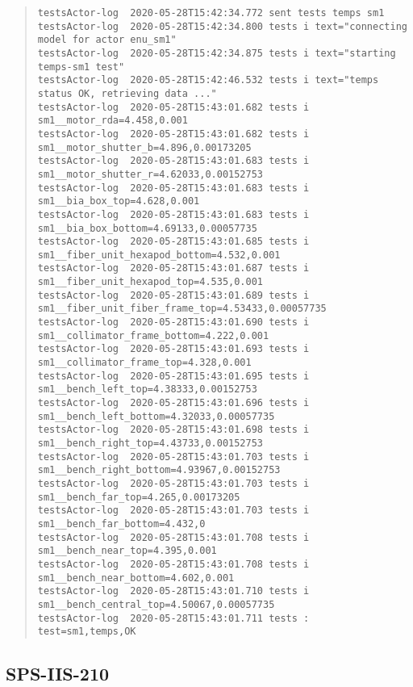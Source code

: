 \begin{quote}
\begin{tiny}
\begin{verbatim}
testsActor-log  2020-05-28T15:42:34.772 sent tests temps sm1
testsActor-log  2020-05-28T15:42:34.800 tests i text="connecting model for actor enu_sm1"
testsActor-log  2020-05-28T15:42:34.875 tests i text="starting temps-sm1 test"
testsActor-log  2020-05-28T15:42:46.532 tests i text="temps status OK, retrieving data ..."
testsActor-log  2020-05-28T15:43:01.682 tests i sm1__motor_rda=4.458,0.001
testsActor-log  2020-05-28T15:43:01.682 tests i sm1__motor_shutter_b=4.896,0.00173205
testsActor-log  2020-05-28T15:43:01.683 tests i sm1__motor_shutter_r=4.62033,0.00152753
testsActor-log  2020-05-28T15:43:01.683 tests i sm1__bia_box_top=4.628,0.001
testsActor-log  2020-05-28T15:43:01.683 tests i sm1__bia_box_bottom=4.69133,0.00057735
testsActor-log  2020-05-28T15:43:01.685 tests i sm1__fiber_unit_hexapod_bottom=4.532,0.001
testsActor-log  2020-05-28T15:43:01.687 tests i sm1__fiber_unit_hexapod_top=4.535,0.001
testsActor-log  2020-05-28T15:43:01.689 tests i sm1__fiber_unit_fiber_frame_top=4.53433,0.00057735
testsActor-log  2020-05-28T15:43:01.690 tests i sm1__collimator_frame_bottom=4.222,0.001
testsActor-log  2020-05-28T15:43:01.693 tests i sm1__collimator_frame_top=4.328,0.001
testsActor-log  2020-05-28T15:43:01.695 tests i sm1__bench_left_top=4.38333,0.00152753
testsActor-log  2020-05-28T15:43:01.696 tests i sm1__bench_left_bottom=4.32033,0.00057735
testsActor-log  2020-05-28T15:43:01.698 tests i sm1__bench_right_top=4.43733,0.00152753
testsActor-log  2020-05-28T15:43:01.703 tests i sm1__bench_right_bottom=4.93967,0.00152753
testsActor-log  2020-05-28T15:43:01.703 tests i sm1__bench_far_top=4.265,0.00173205
testsActor-log  2020-05-28T15:43:01.703 tests i sm1__bench_far_bottom=4.432,0
testsActor-log  2020-05-28T15:43:01.708 tests i sm1__bench_near_top=4.395,0.001
testsActor-log  2020-05-28T15:43:01.708 tests i sm1__bench_near_bottom=4.602,0.001
testsActor-log  2020-05-28T15:43:01.710 tests i sm1__bench_central_top=4.50067,0.00057735
testsActor-log  2020-05-28T15:43:01.711 tests : test=sm1,temps,OK
\end{verbatim}
\end{tiny}
\end{quote}

\subsection{SPS-IIS-210}
\label{sec:tc-210}

